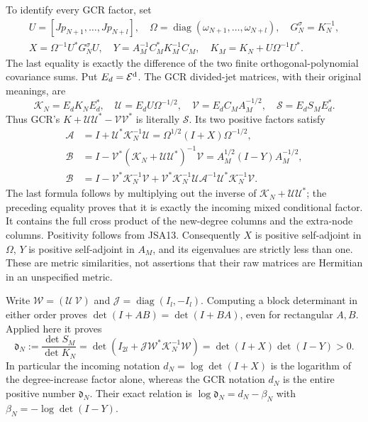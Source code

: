 \documentclass[11pt,a4paper]{article}
\newcommand{\diag}{\operatorname{diag}}
\begin{document}
To identify every GCR factor, set
\[
\begin{gathered}
 U=[Jp_{N+1},\ldots,Jp_{N+l}],\quad
 \Omega=\diag(\omega_{N+1},\ldots,\omega_{N+l}),\quad
 G_N^\sigma=K_N^{-1},\\
 X=\Omega^{-1}U^*G_N^\sigma U,\quad
 Y=A_M^{-1}C_M^*K_M^{-1}C_M,\quad
 K_M=K_N+U\Omega^{-1}U^*.
\end{gathered}\tag{JSA16}
\]
The last equality is exactly the difference of the two finite
orthogonal-polynomial covariance sums. Put $E_d=\mathcal E^{\rm d}$.
The GCR divided-jet matrices, with their original meanings, are
\[
 \mathcal K_N=E_dK_NE_d^*,\quad
 \mathcal U=E_dU\Omega^{-1/2},\quad
 \mathcal V=E_dC_MA_M^{-1/2},\quad
 \mathcal S=E_dS_ME_d^*.
\tag{JSA17}
\]
Thus GCR's $K+\mathcal U\mathcal U^*-\mathcal V\mathcal V^*$
is literally $\mathcal S$. Its two positive factors satisfy
\[
\begin{aligned}
 \mathcal A&=I+\mathcal U^*\mathcal K_N^{-1}\mathcal U
    =\Omega^{1/2}(I+X)\Omega^{-1/2},\\
 \mathcal B&=I-\mathcal V^*(\mathcal K_N+
                        \mathcal U\mathcal U^*)^{-1}\mathcal V
    =A_M^{1/2}(I-Y)A_M^{-1/2},\\
 \mathcal B&=I-\mathcal V^*\mathcal K_N^{-1}\mathcal V
   +\mathcal V^*\mathcal K_N^{-1}\mathcal U\mathcal A^{-1}
                   \mathcal U^*\mathcal K_N^{-1}\mathcal V.
\end{aligned}\tag{JSA18}
\]
The last formula follows by multiplying out the inverse of
$\mathcal K_N+\mathcal U\mathcal U^*$; the preceding equality
proves that it is exactly the incoming mixed conditional factor.
It contains the full cross product of the new-degree columns and
the extra-node columns. Positivity follows from JSA13.
Consequently $X$ is positive self-adjoint in $\Omega$, $Y$ is
positive self-adjoint in $A_M$, and its eigenvalues are strictly
less than one. These are metric similarities, not assertions
that their raw matrices are Hermitian in an unspecified metric.

Write $\mathcal W=(\mathcal U\ \mathcal V)$ and
$\mathcal J=\diag(I_l,-I_l)$. Computing a block determinant
in either order proves $\det(I+AB)=\det(I+BA)$, even for
rectangular $A,B$. Applied here it proves
\[
 \mathfrak d_N:=\frac{\det S_M}{\det K_N}
 =\det(I_{2l}+\mathcal J\mathcal W^*\mathcal K_N^{-1}\mathcal W)
 =\det(I+X)\det(I-Y)>0.
\tag{JSA19}
\]
In particular the incoming notation $d_N=\log\det(I+X)$
is the logarithm of the degree-increase factor alone, whereas
the GCR notation $d_N$ is the entire positive number
$\mathfrak d_N$. Their exact relation is
$\log\mathfrak d_N=d_N-\beta_N$ with
$\beta_N=-\log\det(I-Y)$.
\end{document}
